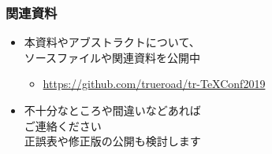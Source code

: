 \begin{frame}\frametitle{関連資料}
  \begin{itemize}
  \item 本資料やアブストラクトについて、 \\
    ソースファイルや関連資料を公開中
    \begin{itemize}
    \item \url{https://github.com/trueroad/tr-TeXConf2019}
    \end{itemize}
  \item 不十分なところや間違いなどあれば \\
    ご連絡ください \\
    正誤表や修正版の公開も検討します
  \end{itemize}
\end{frame}



